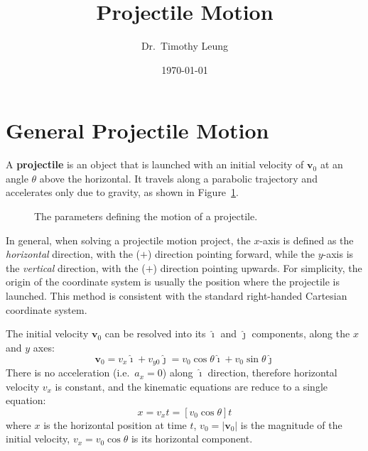 \documentclass{../../../oss-handout}
\title{Projectile Motion}
\author{Dr.\ Timothy Leung}
\date{\today}
\newcommand{\mb}[1]{\mathbf{#1}}
\newcommand{\iii}{\bm{\hat{\imath}}}
\newcommand{\jjj}{\bm{\hat{\jmath}}}
\begin{document}
\thispagestyle{title}
\gentitle

\section{General Projectile Motion}
A \textbf{projectile} is an object that is launched with an initial velocity
of $\mb{v}_0$ at an angle $\theta$ above the horizontal. It travels along a
parabolic trajectory and accelerates only due to gravity, as shown in
Figure~\ref{fig:projectile}. 
\begin{figure}[ht]
  \centering
  \caption{The parameters defining the motion of a projectile.}
  \label{fig:projectile}
\end{figure}

In general, when solving a projectile motion project, the $x$-axis is defined
as the \emph{horizontal} direction, with the ($+$) direction pointing forward,
while the $y$-axis is the \emph{vertical} direction, with the ($+$) direction
pointing upwards. For simplicity, the origin of the coordinate system is usually
the position where the projectile is launched. This method is consistent with
the standard right-handed Cartesian coordinate system.

The initial velocity $\mb{v}_0$ can be resolved into its $\iii$ and $\jjj$
components, along the $x$ and $y$ axes:%
\begin{equation}
  \mb{v}_0
  =v_x\iii+v_{y0}\jjj
  =v_0\cos\theta\iii + v_0\sin\theta\jjj
\end{equation}
There is no acceleration (i.e.\ $a_x=0$) along $\iii$ direction, therefore
horizontal velocity $v_x$ is constant, and the kinematic equations are reduce
to a single equation:
\begin{equation}
  x=v_xt=\left[v_0\cos\theta\right] t
  \label{eq:x}
\end{equation}
where $x$ is the horizontal position at time $t$, $v_0=|\mb{v}_0|$ is the
magnitude of the initial velocity, $v_x=v_0\cos\theta$ is its horizontal
component.
\end{document}
